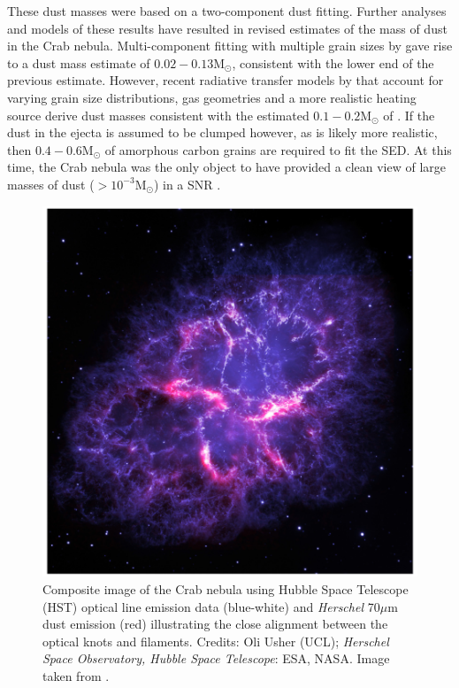 These dust masses were based on a two-component dust fitting.  Further analyses and models of these results have resulted in revised estimates of the mass of dust in the Crab nebula.  Multi-component fitting with multiple grain sizes by \citet{Temim2013} gave rise to a dust mass estimate of $0.02-0.13$M$_{\odot}$, consistent with the lower end of the previous estimate.  However, recent radiative transfer models by \citet{Owen2015} that account for varying grain size distributions, gas geometries and a more realistic heating source derive dust masses consistent with the estimated $0.1-0.2$M$_{\odot}$ of \citet{Gomez2012}.  If the dust in the ejecta is assumed to be clumped however, as is likely more realistic, then $0.4 - 0.6$M$_{\odot}$ of amorphous carbon grains are required to fit the SED.  At this time, the Crab nebula was the only object to have provided a clean view of large masses of dust ($>10^{-3}$M$_{\odot}$) in a SNR .
 
 \begin{figure}
\centering
\includegraphics[clip=true,scale=0.3,trim= 0 0 0 0]{chapters/chapter1/figs/Crab.png}
\caption{Composite image of the Crab nebula using Hubble Space Telescope (HST) optical line emission data (blue-white) and {\em Herschel} 70$\mu$m dust emission (red) illustrating the close alignment between the optical knots and filaments.  Credits: Oli Usher (UCL); \textit{Herschel Space Observatory, Hubble Space Telescope}: ESA, NASA.  Image taken from \citet{Owen2015}.}
\label{fig:Crab}
\end{figure}
 
